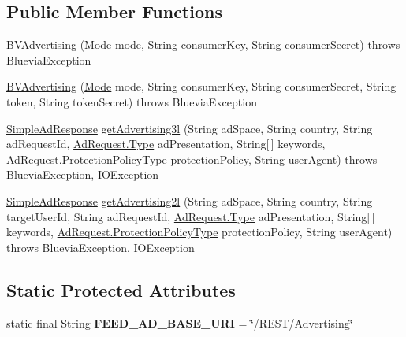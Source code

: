 \subsection*{Public Member Functions}
\begin{DoxyCompactItemize}
\item 
\hyperlink{classcom_1_1bluevia_1_1ad_1_1client_1_1BVAdvertising_a7655f5ab02dee6dd1ccef08709257c8e}{BVAdvertising} (\hyperlink{classcom_1_1bluevia_1_1commons_1_1client_1_1BVBaseClient_a5f4a4a27d73a8ddd0ce450a6c7a4d1b7}{Mode} mode, String consumerKey, String consumerSecret)  throws BlueviaException
\item 
\hyperlink{classcom_1_1bluevia_1_1ad_1_1client_1_1BVAdvertising_ae4fe6c972a8c0f2d4d237852e5cfd508}{BVAdvertising} (\hyperlink{classcom_1_1bluevia_1_1commons_1_1client_1_1BVBaseClient_a5f4a4a27d73a8ddd0ce450a6c7a4d1b7}{Mode} mode, String consumerKey, String consumerSecret, String token, String tokenSecret)  throws BlueviaException
\item 
\hyperlink{classcom_1_1bluevia_1_1ad_1_1data_1_1simple_1_1SimpleAdResponse}{SimpleAdResponse} \hyperlink{classcom_1_1bluevia_1_1ad_1_1client_1_1BVAdvertising_a0b6442b05b9b2d5f815525b5528e0138}{getAdvertising3l} (String adSpace, String country, String adRequestId, \hyperlink{classcom_1_1bluevia_1_1ad_1_1data_1_1AdRequest_a09c6520d8fe767e50b3629a4a3583ef3}{AdRequest.Type} adPresentation, String\mbox{[}$\,$\mbox{]} keywords, \hyperlink{classcom_1_1bluevia_1_1ad_1_1data_1_1AdRequest_abd707475c19957f294689451d338c099}{AdRequest.ProtectionPolicyType} protectionPolicy, String userAgent)  throws BlueviaException, IOException 
\item 
\hyperlink{classcom_1_1bluevia_1_1ad_1_1data_1_1simple_1_1SimpleAdResponse}{SimpleAdResponse} \hyperlink{classcom_1_1bluevia_1_1ad_1_1client_1_1BVAdvertising_ad42decb3233f3645b4e5b817f88e94c4}{getAdvertising2l} (String adSpace, String country, String targetUserId, String adRequestId, \hyperlink{classcom_1_1bluevia_1_1ad_1_1data_1_1AdRequest_a09c6520d8fe767e50b3629a4a3583ef3}{AdRequest.Type} adPresentation, String\mbox{[}$\,$\mbox{]} keywords, \hyperlink{classcom_1_1bluevia_1_1ad_1_1data_1_1AdRequest_abd707475c19957f294689451d338c099}{AdRequest.ProtectionPolicyType} protectionPolicy, String userAgent)  throws BlueviaException, IOException 
\end{DoxyCompactItemize}
\subsection*{Static Protected Attributes}
\begin{DoxyCompactItemize}
\item 
\hypertarget{classcom_1_1bluevia_1_1ad_1_1client_1_1BVAdvertising_a4f12b62fdfdc88be6176b904c87d74a4}{
static final String {\bfseries FEED\_\-AD\_\-BASE\_\-URI} = \char`\"{}/REST/Advertising\char`\"{}}
\label{classcom_1_1bluevia_1_1ad_1_1client_1_1BVAdvertising_a4f12b62fdfdc88be6176b904c87d74a4}

\end{DoxyCompactItemize}


